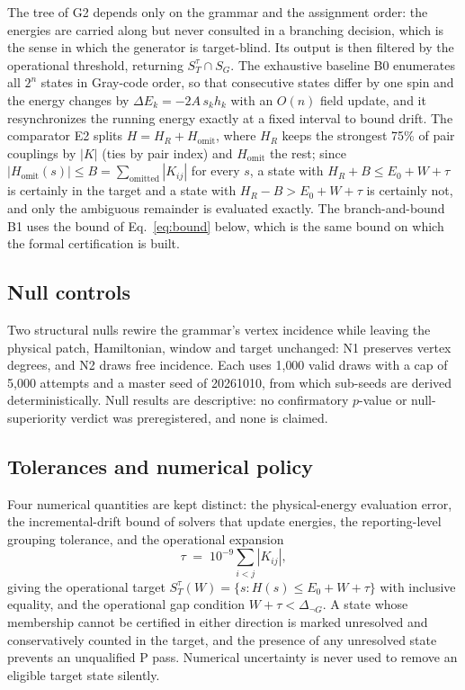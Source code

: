\documentclass[11pt,a4paper]{article}
\theoremstyle{plain}
\theoremstyle{definition}
\theoremstyle{remark}
\newcommand{\SG}{S_{G}}
\newcommand{\ST}{S_{T}}
\newcommand{\dnG}{\Delta_{\neg G}}
\newcommand{\Eo}{E_{0}}
\begin{document}
The tree of G2 depends only on the grammar and the assignment order: the energies are carried along but never consulted in a branching decision, which is the sense in which the generator is target-blind. Its output is then filtered by the operational threshold, returning $\ST^{\tau}\cap\SG$. The exhaustive baseline B0 enumerates all $2^n$ states in Gray-code order, so that consecutive states differ by one spin and the energy changes by $\Delta E_k=-2A\,s_kh_k$ with an $O(n)$ field update, and it resynchronizes the running energy exactly at a fixed interval to bound drift. The comparator E2 splits $H=H_R+H_{\mathrm{omit}}$, where $H_R$ keeps the strongest 75\% of pair couplings by $|K|$ (ties by pair index) and $H_{\mathrm{omit}}$ the rest; since $|H_{\mathrm{omit}}(s)|\le B=\sum_{\mathrm{omitted}}|K_{ij}|$ for every $s$, a state with $H_R+B\le\Eo+W+\tau$ is certainly in the target and a state with $H_R-B>\Eo+W+\tau$ is certainly not, and only the ambiguous remainder is evaluated exactly. The branch-and-bound B1 uses the bound of Eq.~\eqref{eq:bound} below, which is the same bound on which the formal certification is built.

\subsection{Null controls}
Two structural nulls rewire the grammar's vertex incidence while leaving the physical patch, Hamiltonian, window and target unchanged: N1 preserves vertex degrees, and N2 draws free incidence. Each uses 1{,}000 valid draws with a cap of 5{,}000 attempts and a master seed of 20261010, from which sub-seeds are derived deterministically. Null results are descriptive: no confirmatory $p$-value or null-superiority verdict was preregistered, and none is claimed.

\subsection{Tolerances and numerical policy}
Four numerical quantities are kept distinct: the physical-energy evaluation error, the incremental-drift bound of solvers that update energies, the reporting-level grouping tolerance, and the operational expansion
\[
\tau \;=\; 10^{-9}\sum_{i<j}|K_{ij}| ,
\]
giving the operational target $\ST^{\tau}(W)=\{s: H(s)\le\Eo+W+\tau\}$ with inclusive equality, and the operational gap condition $W+\tau<\dnG$. A state whose membership cannot be certified in either direction is marked unresolved and conservatively counted in the target, and the presence of any unresolved state prevents an unqualified P pass. Numerical uncertainty is never used to remove an eligible target state silently.
\end{document}
